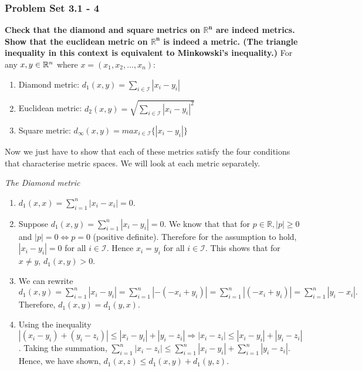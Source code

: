 \begin{frame}
\frametitle{Problem Set 3.1 - 4}
\textbf{Check that the diamond and square metrics on $\bm{\mathbb{R}^n}$ are
indeed metrics. Show that the euclidean metric on $\bm{\mathbb{R}^n}$ is indeed
a metric. (The triangle inequality in this context is equivalent to Minkowski’s
inequality.)}\hfill\break
\hfill\break
For any $x, y \in \mathbb{R}^n $ where $x = (x_1, x_2, \ldots,x_n)$: 
\begin{enumerate}
    \item Diamond metric: $d_1(x,y) = \sum_{i\in \mathcal{I}} |x_i - y_i| $
    \item Euclidean metric: $d_2(x,y) = \sqrt{\sum_{i\in \mathcal{I}} |x_i -
    y_i|^2} $
    \item Square metric: $d_{\infty}(x,y) = max_{i\in \mathcal{I}}\{|x_i -
    y_i|\}$
\end{enumerate}
\hfill\break
Now we just have to show that each of these metrics satisfy the four conditions
that characterise metric spaces. We will look at each metric separately.
\end{frame}

\begin{frame}
\textit{The Diamond metric}\hfill\break
\begin{enumerate}
    \item $d_1(x,x) = \sum_{i=1}^{n} |x_i - x_i| = 0$.
    \item Suppose $d_1(x,y) = \sum_{i=1}^{n} |x_i - y_i| = 0$. We know that that
    for $p \in \mathbb{R}, |p|\geq 0$ and $|p| = 0 \iff p = 0$ (positive
    definite). Therefore for the assumption to hold, $|x_i - y_i| = 0$ for all
    $i \in \mathcal{I}$. Hence $x_i = y_i$ for all $i \in \mathcal{I}$. This
    shows that for $x\neq y$, $d_1(x,y)>0$.
    \item We can rewrite $d_1(x,y) = \sum_{i=1}^{n} |x_i - y_i| = \sum_{i=1}^{n}
    |- (- x_i + y_i)| = \sum_{i=1}^{n} |(- x_i + y_i)| = \sum_{i=1}^{n} |y_i -
    x_i |.$ Therefore, $d_1(x,y) = d_1(y,x).$
    \item Using the inequality $|(x_i - y_i) + (y_i - z_i)| \leq |x_i -
    y_i| + |y_i - z_i| \Rightarrow |x_i - z_i| \leq |x_i - y_i| + |y_i - z_i|$.
    Taking the summation, $\sum_{i=1}^{n}|x_i - z_i| \leq \sum_{i=1}^{n}|x_i -
    y_i| + \sum_{i=1}^{n}|y_i - z_i|$. Hence, we have shown, $d_1(x,z) \leq
    d_1(x,y)+d_1(y,z).$
\end{enumerate}
\end{frame}

